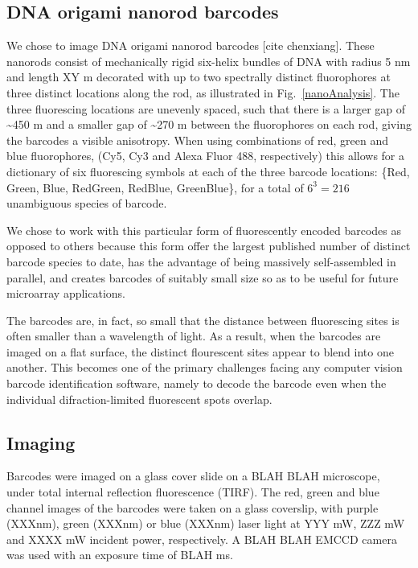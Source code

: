 \subsection{DNA origami nanorod barcodes}
We chose to image DNA origami nanorod barcodes [cite chenxiang]. These nanorods consist of mechanically rigid six-helix bundles of DNA with radius 5 nm and length XY \textmu m decorated with  up to two spectrally distinct fluorophores at three distinct locations along the rod, as illustrated in Fig.~\ref{nanoAnalysis}. The three fluorescing locations are unevenly spaced, such that there is a larger gap of \textasciitilde 450 \textmu m and a smaller gap of \textasciitilde 270 \textmu m  between the fluorophores on each rod, giving the barcodes a visible anisotropy. When using combinations of red, green and blue fluorophores, (Cy5, Cy3 and Alexa Fluor 488, respectively) this allows for a dictionary of six fluorescing symbols at each of the three barcode locations: \{Red, Green, Blue, RedGreen, RedBlue, GreenBlue\}, for a total of $6^{3}=216$  unambiguous species of barcode.

We chose to work with this particular form of fluorescently encoded barcodes as opposed to others because this form offer the largest published number of distinct barcode species to date, has the advantage of being massively self-assembled in parallel, and creates barcodes of suitably small  size so as to be useful for future microarray applications. 

The barcodes are, in fact, so small that the distance between fluorescing sites is often smaller than a wavelength of light. As a result, when the barcodes are imaged on a flat surface, the distinct flourescent sites appear to blend into one another. This becomes one of the primary challenges facing any computer vision barcode identification software, namely to  decode the barcode even when the individual difraction-limited fluorescent spots overlap. 

\subsection{Imaging}
Barcodes were imaged on a glass cover slide on a BLAH BLAH microscope,  under total internal reflection fluorescence (TIRF). 
The red, green and blue channel images of the barcodes were taken on a glass coverslip, with purple (XXXnm), green (XXXnm) or blue (XXXnm) laser light at YYY mW, ZZZ mW and XXXX mW incident power, respectively. A BLAH BLAH EMCCD camera was used with an exposure time of BLAH ms.
 
